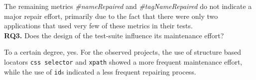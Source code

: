 The remaining metrics \textit{\#nameRepaired} and \textit{\#tagNameRepaired} do not indicate a major repair effort, primarily due to the fact that there were only two applications that used very few of these metrics in their tests. \\

\noindent \textbf{RQ3.} Does the design of the test-suite influence its maintenance effort?

To a certain degree, yes. For the observed projects, the use of structure based locators \texttt{css selector} and  \texttt{xpath} showed a more frequent maintenance effort, while the use of \texttt{id}s indicated a less frequent repairing process.    

 





